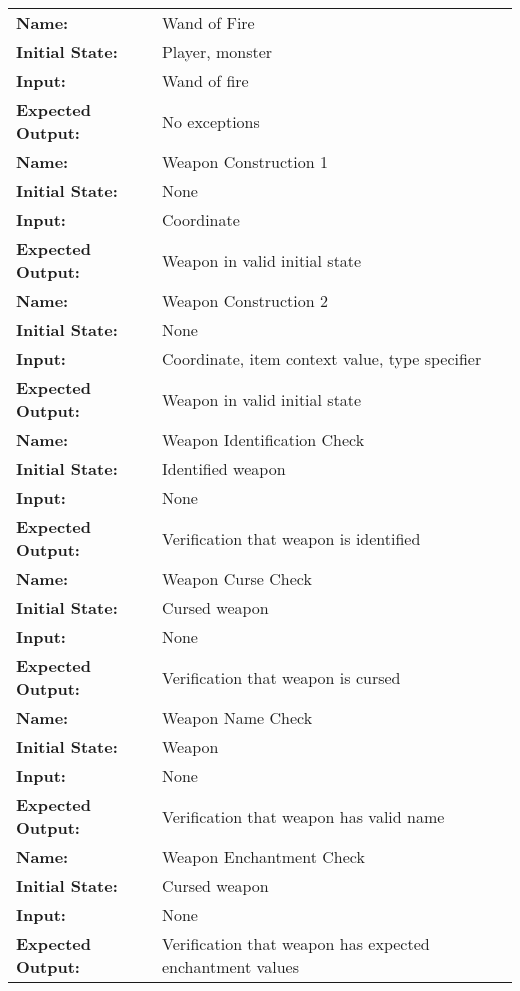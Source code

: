 \documentclass[12pt, titlepage]{article}
\begin{document}
\begin{center}
\begin{longtable}{ l | p{10cm} }
				\hline
				\textbf{Name:} & Wand of Fire\\
				\textbf{Initial State:} & Player, monster\\
				\textbf{Input:} & Wand of fire\\
				\textbf{Expected Output:} & No exceptions\\
				\hline
				\textbf{Name:} & Weapon Construction 1\\
				\textbf{Initial State:} & None\\
				\textbf{Input:} & Coordinate\\
				\textbf{Expected Output:} & Weapon in valid initial state\\
				\hline
				\textbf{Name:} & Weapon Construction 2\\
				\textbf{Initial State:} & None\\
				\textbf{Input:} & Coordinate, item context value, type specifier\\
				\textbf{Expected Output:} & Weapon in valid initial state\\
				\hline
				\textbf{Name:} & Weapon Identification Check\\
				\textbf{Initial State:} & Identified weapon\\
				\textbf{Input:} & None\\
				\textbf{Expected Output:} & Verification that weapon is identified\\
				\hline
				\textbf{Name:} & Weapon Curse Check\\
				\textbf{Initial State:} & Cursed weapon\\
				\textbf{Input:} & None\\
				\textbf{Expected Output:} & Verification that weapon is cursed\\
				\hline
				\textbf{Name:} & Weapon Name Check\\
				\textbf{Initial State:} & Weapon\\
				\textbf{Input:} & None\\
				\textbf{Expected Output:} & Verification that weapon has valid name\\
				\hline
				\textbf{Name:} & Weapon Enchantment Check\\
				\textbf{Initial State:} & Cursed weapon\\
				\textbf{Input:} & None\\
				\textbf{Expected Output:} & Verification that weapon has expected enchantment values\\
				\hline

			\end{longtable}

		\end{center}
\end{document}
